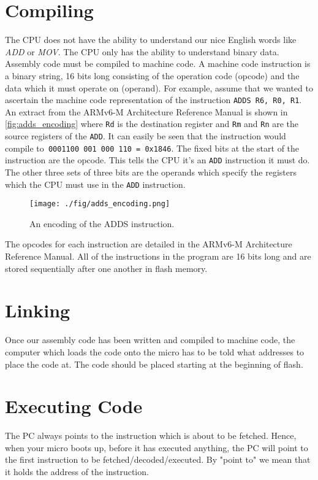 \section{Compiling}
The CPU does not have the ability to understand our nice English words like \textit{ADD} or \textit{MOV}. The CPU only has the ability to understand binary data. Assembly code must be compiled to machine code. A machine code instruction is a binary string, 16 bits long consisting of the operation code (opcode) and the data which it must operate on (operand).
For example, assume that we wanted to ascertain the machine code representation of the instruction \texttt{ADDS R6, R0, R1}. An extract from the ARMv6-M Architecture Reference Manual is shown in \autoref{fig:adds_encoding} where \texttt{Rd} is the destination register and \texttt{Rm} and \texttt{Rn} are the source registers of the \texttt{ADD}. It can easily be seen that the instruction would compile to\texttt{ 0001100 001 000 110 = 0x1846}. The fixed bits at the start of the instruction are the opcode. This tells the CPU it's an \texttt{ADD} instruction it must do. The other three sets of three bits are the operands which specify the registers which the CPU must use in the \texttt{ADD} instruction. 
\begin{figure}
  \centering
  \texttt{[image: ./fig/adds\_encoding.png]}
  \caption{An encoding of the ADDS instruction.}
  \label{fig:adds_encoding}
\end{figure}
The opcodes for each instruction are detailed in the ARMv6-M Architecture Reference Manual.
All of the instructions in the program are 16 bits long and are stored sequentially after one another in flash memory. 

\section{Linking}
Once our assembly code has been written and compiled to machine code, the computer which loads the code onto the micro has to be told what addresses to place the code at. The code should be placed starting at the beginning of flash.

\section{Executing Code}
The PC always points to the instruction which is about to be fetched. Hence, when your micro boots up, before it has executed anything, the PC will point to the first instruction to be fetched/decoded/executed. By "point to" we mean that it holds the address of the instruction. 

